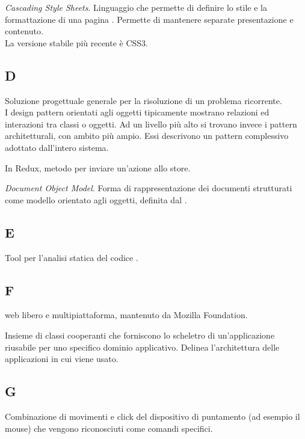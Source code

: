 		\textit{Cascading Style Sheets}. Linguaggio che permette di definire lo stile e la formattazione di una pagina . Permette di mantenere separate presentazione e contenuto. \\
		La versione stabile più recente è CSS3.
		
	\subsection{D}
	
	Soluzione progettuale generale per la risoluzione di un problema ricorrente. \\
	I design pattern orientati agli oggetti tipicamente mostrano relazioni ed interazioni tra classi o oggetti.
	Ad un livello più alto si trovano invece i pattern architetturali, con ambito più ampio. Essi descrivono un pattern complessivo adottato dall'intero sistema.
	
	In Redux, metodo per inviare un'azione allo store.
	
	\textit{Document Object Model}. Forma di rappresentazione dei documenti strutturati come modello orientato agli oggetti, definita dal .
	
	\subsection{E}
	
	Tool per l'analisi statica del codice .
	
	\subsection{F}
		 web  libero e multipiattaforma, mantenuto da Mozilla Foundation.
		
		Insieme di classi cooperanti che forniscono lo scheletro di un'applicazione riusabile per uno specifico dominio applicativo. Delinea l'architettura delle applicazioni in cui viene usato.
		
	\subsection{G}
		Combinazione di movimenti e click del dispositivo di puntamento (ad esempio il mouse) che vengono riconosciuti come comandi specifici.
		
